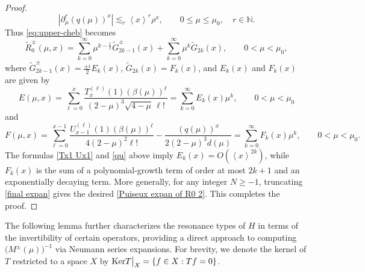 \documentclass[reqno, 11pt]{amsart}
\newcommand\N{\mathbb{N}}
\numberwithin{equation}{section}
\begin{document}
\begin{proof}
\begin{equation}
\left|\partial_\mu^r (q(\mu))^x\right|
\lesssim_r \left<x\right>^r\rho^x,
\qquad 0\leq\mu\leq\mu_0,\quad r\in\N.
\end{equation}
Thus \eqref{eq:upper-cheb} becomes
\begin{equation}\label{final expan}
\widetilde R_0^\pm(\mu,x)
=
\sum_{k=0}^{\infty}
\mu^{k-\frac12}\widetilde G_{2k-1}^\pm(x)
+
\sum_{k=0}^{\infty}
\mu^k\widetilde G_{2k}(x),\qquad0<\mu<\mu_0, 
\end{equation} 
where $\widetilde G_{2k-1}^\pm(x)=\frac{\pm i}{2}E_k(x)$, $\widetilde G_{2k}(x)=F_k(x)$, and $E_k(x)$ and $F_k(x)$ are given by
\begin{equation*}
E(\mu,x)=\sum_{\ell=0}^{x}
\frac{T_x^{(\ell)}(1)(\beta(\mu))^\ell}
{(2-\mu)^3\sqrt{4-\mu}\,\ell!}=\sum_{k=0}^\infty E_k(x)\mu^k,\qquad0<\mu<\mu_0
\end{equation*}
and 
\begin{equation*}
F(\mu,x)=\sum_{\ell=0}^{x-1}
\frac{U_{x-1}^{(\ell)}(1)(\beta(\mu))^\ell}
{4(2-\mu)^2\ell!}
-\frac{(q(\mu))^x}{2(2-\mu)^3d(\mu)}=\sum\limits_{k=0}^{\infty}F_k(x)\mu^k,\qquad0<\mu<\mu_0.
\end{equation*}
The formulas \eqref{Tx1 Ux1} and \eqref{qu} above imply
$
E_k(x)=O(\left< x\right>^{2k})$,
while $F_k(x)$ is the sum of a polynomial-growth term of order at most
$2k+1$ and an exponentially decaying term. More generally, for any integer $N\geq-1$, truncating
\eqref{final expan} gives the desired \eqref{Puiseux expan of R0 2}. This completes the proof.
\end{proof}
The following lemma further characterizes the resonance types of $H$ in terms of the invertibility of certain operators, providing a direct approach to computing $\big(M^{\pm}(\mu)\big)^{-1}$ via Neumann series expansions. For brevity, we denote the kernel of $T$ restricted to a space $X$ by ${\rm Ker}T\big|_{X}=\{f\in X:Tf=0\}$.
\end{document}
